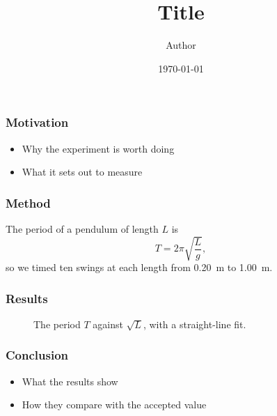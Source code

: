 \documentclass{beamer}
\title{{{Title}}}
\author{{{Author}}}
\institute{Department of Physics}
\date{\today}
\begin{document}
\begin{frame}
  \titlepage
\end{frame}

\begin{frame}
  \frametitle{Motivation}
  \begin{itemize}
    \item Why the experiment is worth doing
    \item What it sets out to measure
  \end{itemize}
\end{frame}

\begin{frame}
  \frametitle{Method}
  The period of a pendulum of length $L$ is
  \begin{equation*}
    T = 2\pi\sqrt{\frac{L}{g}},
  \end{equation*}
  so we timed ten swings at each length from \qty{0.20}{m} to \qty{1.00}{m}.
\end{frame}

\begin{frame}
  \frametitle{Results}
  \begin{figure}
    \caption{The period $T$ against $\sqrt{L}$, with a straight-line fit.}
  \end{figure}
\end{frame}

\begin{frame}
  \frametitle{Conclusion}
  \begin{itemize}
    \item What the results show
    \item How they compare with the accepted value
  \end{itemize}
\end{frame}
\end{document}
